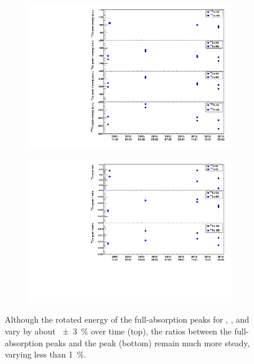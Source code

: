 \documentclass[herrin-thesis.tex]{subfiles}
\begin{document}
\begin{figure}[tbp]
\centering
\begin{subfigure}[b]{0.75\textwidth}
\centering
\includegraphics[width=\textwidth]{./plots/data_peak_energy_v_time.pdf}
\end{subfigure}
\begin{subfigure}[b]{0.75\textwidth}
\centering
\includegraphics[width=1\textwidth]{./plots/data_peak_ratio_v_time.pdf}
\end{subfigure}
\caption[Variation of full-absorption peak energies and their ratios over time]{Although the rotated energy of the full-absorption peaks for , , and  vary by about \SI{\pm3}{\percent} over time (top), the ratios between the full-absorption peaks and the  peak (bottom) remain much more steady, varying less than \SI{1}{\percent}.}
\label{fig:data_energy_ratios_time}
\end{figure}
\end{document}
